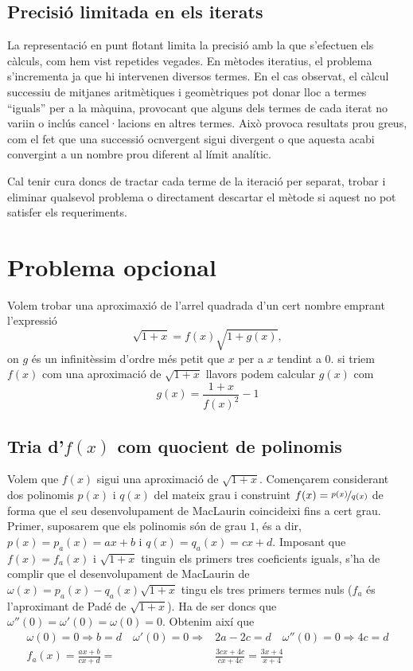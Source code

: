 \documentclass[a4paper,10.4pt]{article}
\begin{document}
\subsection{Precisió limitada en els iterats}

La representació en punt flotant limita la precisió amb la que s'efectuen els càlculs, com hem vist repetides vegades. En mètodes iteratius, el problema s'incrementa ja que hi intervenen diversos termes. En el cas observat, el càlcul successiu de mitjanes aritmètiques i geomètriques pot donar lloc a termes ``iguals'' per a la màquina, provocant que alguns dels termes de cada iterat no variin o inclús cancel·lacions en altres termes. Això provoca resultats prou greus, com el fet que una successió ocnvergent sigui divergent o que aquesta acabi convergint a un nombre prou diferent al límit analític.

Cal tenir cura doncs de tractar cada terme de la iteració per separat, trobar i eliminar qualsevol problema o directament descartar el mètode si aquest no pot satisfer els requeriments.

\section{Problema opcional}

Volem trobar una aproximaxió de l'arrel quadrada d'un cert nombre emprant l'expressió
\begin{equation*}
	\sqrt{1+x}=f(x)\sqrt{1+g(x)},
\end{equation*}
on $g$ és un infinitèssim d'ordre més petit que $x$ per a $x$ tendint a $0$. si triem $f(x)$ com una aproximació de $\sqrt{1+x}$ llavors podem calcular $g(x)$ com
\begin{equation*}
	g(x)=\frac{1+x}{f(x)^2}-1
\end{equation*}
\subsection{Tria d'$f(x)$ com quocient de polinomis}
Volem que $f(x)$ sigui una aproximació de $\sqrt{1+x}$. Començarem considerant dos polinomis $p(x)$ i $q(x)$ del mateix grau i construint $f(x)=\nicefrac{p(x)}{q(x)}$ de forma que el seu desenvolupament de MacLaurin coincideixi fins a cert grau. Primer, suposarem que els polinomis són de grau $1$, és a dir, $p(x)=p_a(x)=ax+b$ i $q(x)=q_a(x)=cx+d$. Imposant que $f(x)=f_a(x)$ i $\sqrt{1+x}$ tinguin els primers tres coeficients iguals, s'ha de complir que el desenvolupament de MacLaurin de $\omega(x)=p_a(x)-q_a(x)\sqrt{1+x}$ tingu els tres primers termes nuls ($f_a$ és l'aproximant de Padé de $\sqrt{1+x}$). Ha de ser doncs que $\omega''(0)=\omega'(0)=\omega(0)=0$. Obtenim així que
\begin{align*}
	\omega(0)=0\Rightarrow b=d\quad \omega'(0)=0\Rightarrow&2a-2c=d\quad \omega''(0)=0\Rightarrow 4c=d\\
	f_a(x)=\frac{ax+b}{cx+d}=&\frac{3cx+4c}{cx+4c}=\frac{3x+4}{x+4}
\end{align*}
\end{document}

